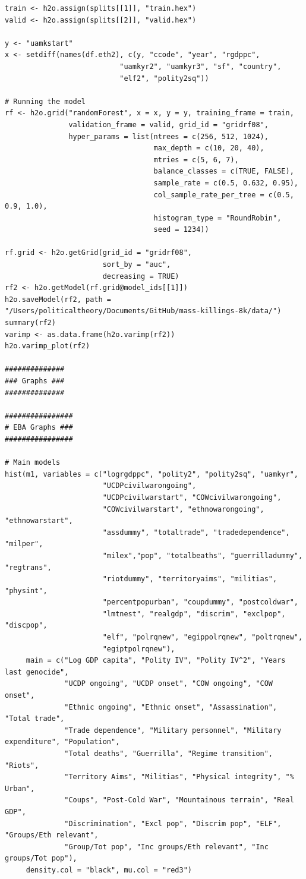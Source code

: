 \begin{verbatim}
train <- h2o.assign(splits[[1]], "train.hex")   
valid <- h2o.assign(splits[[2]], "valid.hex") 

y <- "uamkstart"
x <- setdiff(names(df.eth2), c(y, "ccode", "year", "rgdppc",
                           "uamkyr2", "uamkyr3", "sf", "country",
                           "elf2", "polity2sq")) 

# Running the model
rf <- h2o.grid("randomForest", x = x, y = y, training_frame = train, 
               validation_frame = valid, grid_id = "gridrf08",
               hyper_params = list(ntrees = c(256, 512, 1024),
                                   max_depth = c(10, 20, 40),
                                   mtries = c(5, 6, 7),
                                   balance_classes = c(TRUE, FALSE),
                                   sample_rate = c(0.5, 0.632, 0.95),
                                   col_sample_rate_per_tree = c(0.5, 0.9, 1.0),
                                   histogram_type = "RoundRobin",
                                   seed = 1234)) 

rf.grid <- h2o.getGrid(grid_id = "gridrf08",
                       sort_by = "auc",
                       decreasing = TRUE)
rf2 <- h2o.getModel(rf.grid@model_ids[[1]])
h2o.saveModel(rf2, path = "/Users/politicaltheory/Documents/GitHub/mass-killings-8k/data/")
summary(rf2)
varimp <- as.data.frame(h2o.varimp(rf2))
h2o.varimp_plot(rf2)

##############
### Graphs ###
##############

################
# EBA Graphs ###
################

# Main models
hist(m1, variables = c("logrgdppc", "polity2", "polity2sq", "uamkyr",
                       "UCDPcivilwarongoing",
                       "UCDPcivilwarstart", "COWcivilwarongoing",
                       "COWcivilwarstart", "ethnowarongoing", "ethnowarstart",
                       "assdummy", "totaltrade", "tradedependence", "milper",
                       "milex","pop", "totalbeaths", "guerrilladummy", "regtrans",
                       "riotdummy", "territoryaims", "militias", "physint",
                       "percentpopurban", "coupdummy", "postcoldwar",
                       "lmtnest", "realgdp", "discrim", "exclpop", "discpop",
                       "elf", "polrqnew", "egippolrqnew", "poltrqnew",
                       "egiptpolrqnew"),
     main = c("Log GDP capita", "Polity IV", "Polity IV^2", "Years last genocide",
              "UCDP ongoing", "UCDP onset", "COW ongoing", "COW onset", 
              "Ethnic ongoing", "Ethnic onset", "Assassination", "Total trade", 
              "Trade dependence", "Military personnel", "Military expenditure", "Population", 
              "Total deaths", "Guerrilla", "Regime transition", "Riots",
              "Territory Aims", "Militias", "Physical integrity", "% Urban",
              "Coups", "Post-Cold War", "Mountainous terrain", "Real GDP",
              "Discrimination", "Excl pop", "Discrim pop", "ELF", "Groups/Eth relevant", 
              "Group/Tot pop", "Inc groups/Eth relevant", "Inc groups/Tot pop"),
     density.col = "black", mu.col = "red3")


\end{verbatim}
